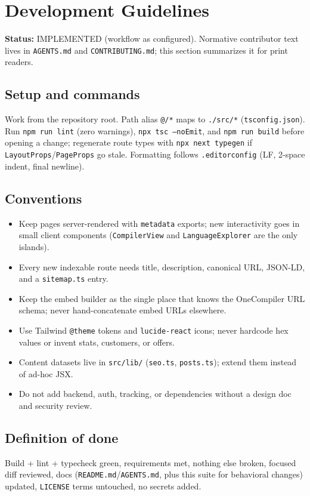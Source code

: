 \section{Development Guidelines}
\label{sec:development-guidelines}

\textbf{Status:} IMPLEMENTED (workflow as configured). Normative contributor text lives in \texttt{AGENTS.md} and \texttt{CONTRIBUTING.md}; this section summarizes it for print readers.

\subsection{Setup and commands}
Work from the repository root. Path alias \texttt{@/*} maps to \texttt{./src/*} (\texttt{tsconfig.json}). Run \texttt{npm run lint} (zero warnings), \texttt{npx tsc --noEmit}, and \texttt{npm run build} before opening a change; regenerate route types with \texttt{npx next typegen} if \texttt{LayoutProps}/\texttt{PageProps} go stale. Formatting follows \texttt{.editorconfig} (LF, 2-space indent, final newline).

\subsection{Conventions}
\begin{itemize}
\item Keep pages server-rendered with \texttt{metadata} exports; new interactivity goes in small client components (\texttt{CompilerView} and \texttt{LanguageExplorer} are the only islands).
\item Every new indexable route needs title, description, canonical URL, JSON-LD, and a \texttt{sitemap.ts} entry.
\item Keep the embed builder as the single place that knows the OneCompiler URL schema; never hand-concatenate embed URLs elsewhere.
\item Use Tailwind \texttt{@theme} tokens and \texttt{lucide-react} icons; never hardcode hex values or invent stats, customers, or offers.
\item Content datasets live in \texttt{src/lib/} (\texttt{seo.ts}, \texttt{posts.ts}); extend them instead of ad-hoc JSX.
\item Do not add backend, auth, tracking, or dependencies without a design doc and security review.
\end{itemize}

\subsection{Definition of done}
Build + lint + typecheck green, requirements met, nothing else broken, focused diff reviewed, docs (\texttt{README.md}/\texttt{AGENTS.md}, plus this suite for behavioral changes) updated, \texttt{LICENSE} terms untouched, no secrets added.
